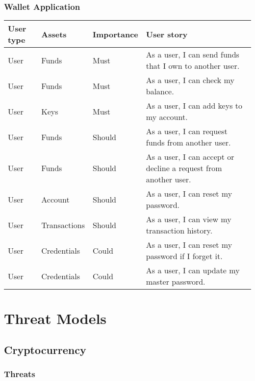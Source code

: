\documentclass[12pt]{article}
\begin{document}
\subsubsection*{Wallet Application}

\begin{tabularx}{\linewidth}{|l|l|l|X|}
\hline
\textbf{User type} & \textbf{Assets} & \textbf{Importance} & \textbf{User story} \\
\hline
User & Funds & Must & As a user, I can send funds that I own to another user. \\
\hline
User & Funds & Must & As a user, I can check my balance. \\
\hline
User & Keys & Must & As a user, I can add keys to my account. \\
\hline
User & Funds & Should & As a user, I can request funds from another user. \\
\hline
User & Funds & Should & As a user, I can accept or decline a request from another user. \\
\hline
User & Account & Should & As a user, I can reset my password. \\
\hline
User & Transactions & Should & As a user, I can view my transaction history. \\
\hline
User & Credentials & Could & As a user, I can reset my password if I forget it. \\
\hline
User & Credentials & Could & As a user, I can update my master password. \\
\end{tabularx}

\section{Threat Models}

\subsection{Cryptocurrency}

\subsubsection*{Threats}
\end{document}
